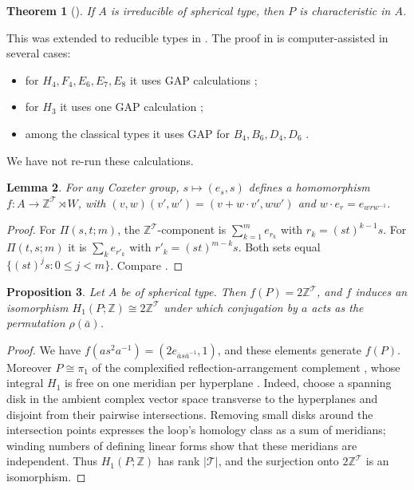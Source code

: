 \documentclass[11pt]{article}
\newtheorem{theorem}{Theorem}[section]
\newtheorem{lemma}[theorem]{Lemma}
\newtheorem{proposition}[theorem]{Proposition}
\theoremstyle{definition}
\newcommand{\Z}{\mathbb{Z}}
\newcommand{\T}{\mathcal{T}}
\begin{document}
\begin{theorem}[{\cite[Thm.~1.4]{CP03}}]\label{thm:char}
If $A$ is irreducible of spherical type, then $P$ is characteristic in $A$.
\end{theorem}

This was extended to reducible types in \cite{FP06}. The proof in \cite{CP03} is computer-assisted in several
cases:
\begin{itemize}
\item for $H_4,F_4,E_6,E_7,E_8$ it uses GAP calculations \cite[Prop.~5.4, Cor.~5.5]{CP03};
\item for $H_3$ it uses one GAP calculation \cite[Lemma~5.1]{CP03};
\item among the classical types it uses GAP for $B_4,B_6,D_4,D_6$ \cite[Lemmas~3.5, 4.4]{CP03}.
\end{itemize}
We have not re-run these calculations.

\begin{lemma}\label{lem:f}
For any Coxeter group, $s\mapsto(e_s,s)$ defines a homomorphism $f\colon A\to\Z^\T\rtimes W$, with
$(v,w)(v',w')=(v+w\cdot v',ww')$ and $w\cdot e_r=e_{wrw^{-1}}$.
\end{lemma}
\begin{proof}
For $\Pi(s,t;m)$, the $\Z^\T$-component is $\sum_{k=1}^me_{r_k}$ with $r_k=(st)^{k-1}s$. For $\Pi(t,s;m)$ it is
$\sum_ke_{r'_k}$ with $r'_k=(st)^{m-k}s$. Both sets equal $\{(st)^js:0\le j<m\}$. Compare \cite[Lemma~3.7]{CP03}.
\end{proof}

\begin{proposition}\label{prop:H1}
Let $A$ be of spherical type. Then $f(P)=2\Z^\T$, and $f$ induces an isomorphism $H_1(P;\Z)\cong2\Z^\T$ under which
conjugation by $a$ acts as the permutation $\rho(\bar a)$.
\end{proposition}
\begin{proof}
We have $f(as^2a^{-1})=(2e_{\bar as\bar a^{-1}},1)$, and these elements generate $f(P)$. Moreover $P\cong\pi_1$ of
the complexified reflection-arrangement complement \cite{Bri71}, whose integral $H_1$ is free on one
meridian per hyperplane \cite[\S2.3]{Suc14}. Indeed, choose a spanning disk in the ambient complex vector
space transverse to the hyperplanes and disjoint from their pairwise intersections. Removing small disks
around the intersection points expresses the loop's homology class as a sum of meridians;
winding numbers of defining linear forms show that these meridians are independent.
Thus $H_1(P;\Z)$ has rank $|\T|$, and the surjection onto $2\Z^\T$ is an isomorphism.
\end{proof}
\end{document}
